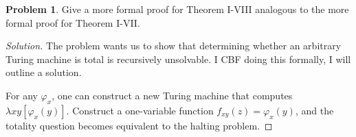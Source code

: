 \documentclass{article}
\theoremstyle{definition}
\newtheorem{prob}{Problem}[section]  %
\newenvironment{soln}
  {\begin{proof}[Solution]\setlength{\parskip}{0pt}} %
  {\end{proof}\vspace{-5pt}} %
\begin{document}
\setcounter{prob}{7-1}
\begin{prob}
	Give a more formal proof for Theorem I-VIII analogous to the more formal proof for Theorem I-VII.
\end{prob}
\begin{soln}
	The problem wants us to show that determining whether an arbitrary Turing machine is total is recursively unsolvable. I CBF doing this formally, I will outline a solution.\par
	For any $\varphi_x$, one can construct a new Turing machine that computes $\lambda xy[\varphi_x(y)]$. Construct a one-variable function $f_{xy}(z)=\varphi_x(y)$, and the totality question becomes equivalent to the halting problem.
\end{soln}
\end{document}
